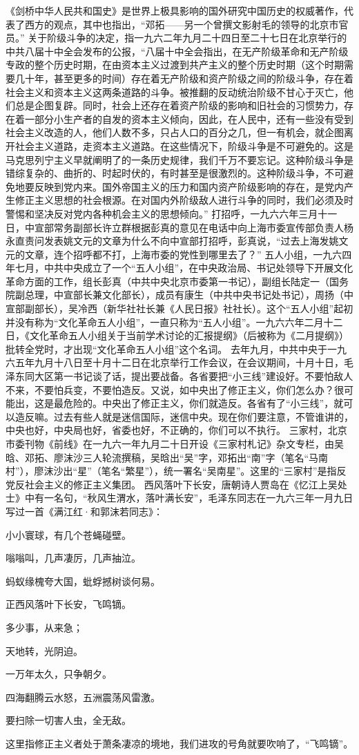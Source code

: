 \begin{maonote}
《剑桥中华人民共和国史》是世界上极具影响的国外研究中国历史的权威著作，代表了西方的观点，其中也指出，“邓拓——另一个曾撰文影射毛的领导的北京市官员。”
关于阶级斗争的决定，指一九六二年九月二十四日至二十七日在北京举行的中共八届十中全会发布的公报，“八届十中全会指出，在无产阶级革命和无产阶级专政的整个历史时期，在由资本主义过渡到共产主义的整个历史时期（这个时期需要几十年，甚至更多的时间）存在着无产阶级和资产阶级之间的阶级斗争，存在着社会主义和资本主义这两条道路的斗争。被推翻的反动统治阶级不甘心于灭亡，他们总是企图复辟。同时，社会上还存在着资产阶级的影响和旧社会的习惯势力，存在着一部分小生产者的自发的资本主义倾向，因此，在人民中，还有一些没有受到社会主义改造的人，他们人数不多，只占人口的百分之几，但一有机会，就企图离开社会主义道路，走资本主义道路。在这些情况下，阶级斗争是不可避免的。这是马克思列宁主义早就阐明了的一条历史规律，我们千万不要忘记。这种阶级斗争是错综复杂的、曲折的、时起时伏的，有时甚至是很激烈的。这种阶级斗争，不可避免地要反映到党内来。国外帝国主义的压力和国内资产阶级影响的存在，是党内产生修正主义思想的社会根源。在对国内外阶级敌人进行斗争的同时，我们必须及时警惕和坚决反对党内各种机会主义的思想倾向。”
打招呼，一九六六年三月十一日，中宣部常务副部长许立群根据彭真的意见在电话中向上海市委宣传部负责人杨永直责问发表姚文元的文章为什么不向中宣部打招呼，彭真说，“过去上海发姚文元的文章，连个招呼都不打，上海市委的党性到哪里去了？”
五人小组，一九六四年七月，中共中央成立了一个“五人小组”，在中央政治局、书记处领导下开展文化革命方面的工作，组长彭真（中共中央北京市委第一书记），副组长陆定一（国务院副总理，中宣部长兼文化部长），成员有康生（中共中央书记处书记），周扬（中宣部副部长），吴冷西（新华社社长兼《人民日报》社社长）。这个“五人小组”起初并没有称为“文化革命五人小组”，一直只称为“五人小组”。一九六六年二月十二日，《文化革命五人小组关于当前学术讨论的汇报提纲》（后被称为《二月提纲》）批转全党时，才出现“文化革命五人小组”这个名词。
去年九月，中共中央于一九六五年九月十八日至十月十二日在北京举行工作会议，在会议期间，十月十日，毛泽东同大区第一书记谈了话，提出要战备。各省要把“小三线”建设好。不要怕敌人不来，不要怕兵变，不要怕造反。又说，如中央出了修正主义，你们怎么办？很可能出，这是最危险的。中央出了修正主义，你们就造反。各省有了“小三线”，就可以造反嘛。过去有些人就是迷信国际，迷信中央。现在你们要注意，不管谁讲的，中央也好，中央局也好，省委也好，不正确的，你们可以不执行。
三家村，北京市委刊物《前线》在一九六一年九月二十日开设《三家村札记》杂文专栏，由吴晗、邓拓、廖沫沙三人轮流撰稿，吴晗出“吴”字，邓拓出“南”字（笔名“马南村”），廖沫沙出“星”（笔名“繁星”），统一署名“吴南星”。这里的“三家村”是指反党反社会主义的修正主义集团。
西风落叶下长安，唐朝诗人贾岛在《忆江上吴处士》中有一名句，“秋风生渭水，落叶满长安”，毛泽东同志在一九六三年一月九日写过一首《满江红·和郭沫若同志》：

小小寰球，有几个苍蝇碰壁。

嗡嗡叫，几声凄厉，几声抽泣。

蚂蚁缘槐夸大国，蚍蜉撼树谈何易。

正西风落叶下长安，飞鸣镝。

多少事，从来急；

天地转，光阴迫。

一万年太久，只争朝夕。

四海翻腾云水怒，五洲震荡风雷激。

要扫除一切害人虫，全无敌。

这里指修正主义者处于萧条凄凉的境地，我们进攻的号角就要吹响了，“飞鸣镝”。
\end{maonote}
